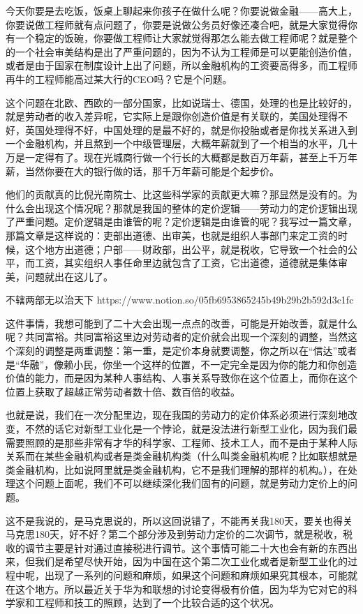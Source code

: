 \documentclass[UTF8, 12pt, a4paper]{ctexrep}
\begin{document}
今天你要是去吃饭，饭桌上聊起来你孩子在做什么呢？你要说做金融——高大上，你要说做工程师就有点问题了，你要是说做公务员好像还凑合吧，就是大家觉得你有一个稳定的饭碗，你要做工程师让大家就觉得那怎么能去做工程师呢？就是整个的一个社会审美结构是出了严重问题的，因为不认为工程师是可以更能创造价值，或者是由于国家在制度设计上出了问题，所以金融机构的工资要高得多，而工程师再牛的工程师能高过某大行的CEO吗？它是个问题。

这个问题在北欧、西欧的一部分国家，比如说瑞士、德国，处理的也是比较好的，就是劳动者的收入差异呢，它实际上是跟你创造价值是有关联的，美国处理得不好，英国处理得不好，中国处理的是最不好的，就是你投胎或者是你找关系进入到一个金融机构，并且熬到一个中级管理层，大概年薪就到了一个相当的水平，几十万是一定得有了。现在光城商行做一个行长的大概都是数百万年薪，甚至上千万年薪，当然你要在大的银行做的话，那千万年薪可能是个起步价。

他们的贡献真的比倪光南院士、比这些科学家的贡献更大嘛？那显然是没有的。为什么会出现这个情况呢？那就是我国的整体的定价逻辑——劳动力的定价逻辑出现了严重问题。定价逻辑是由谁管的呢？定价逻辑是由谁管的呢？我写过一篇文章，那篇文章是这样说的：吏部出道德、出审美，也就是组织人事部门来定工资的时候，这个地方出道德；户部——财政部，出公平，就是税收，它导致一个社会的公平，而工资，其实组织人事任命里边就包含了工资，它出道德，道德就是集体审美，问题就出在这儿了。

不辖两部无以治天下 https://www.notion.so/05fb6953865245b49b29b2b592d3c1fc

这件事情，我想可能到了二十大会出现一点点的改善，可能是开始改善，就是什么呢？共同富裕。共同富裕这里边对劳动者的定价就会出现一个深刻的调整，当然这个深刻的调整是两重调整：第一重，是定价本身就要调整，你之所以在“信达”或者是“华融”，像赖小民，你坐一个这样的位置，不一定完全是因为你的能力和你创造价值的能力，而是因为某种人事结构、人事关系导致你在这个位置上，而你在这个位置上获取了超越正常劳动者数十倍、数百倍的收益。

也就是说，我们在一次分配里边，现在我国的劳动力的定价体系必须进行深刻地改变，不然的话它对新型工业化是一个悖论，就是没法进行新型工业化，因为我们最需要照顾的是那些非常有才华的科学家、工程师、技术工人，而不是由于某种人际关系而在某些金融机构或者是类金融机构类（什么叫类金融机构呢？比如联想就是类金融机构，比如说阿里就是类金融机构，它不是我们理解的那样的机构。），在处理这个问题上面呢，我们不可以继续深化我们固有的问题，就是劳动力定价上的问题。

这不是我说的，是马克思说的，所以这回说错了，不能再关我180天，要关也得关马克思180天，好不好？第二个部分涉及到劳动力定价的二次调节，就是税收，税收的调节主要是针对通过直接税进行调节。这个事情可能二十大也会有新的东西出来，但我们是希望尽快开始，因为中国在这个第二次工业化或者是新型工业化的过程中呢，出现了一系列的问题和麻烦，如果这个问题和麻烦如果究其根本，可能就在这个地方。所以最近关于华为和联想的讨论变得极有价值，因为华为它对它的科学家和工程师和技工的照顾，达到了一个比较合适的这个状况。
\end{document}
